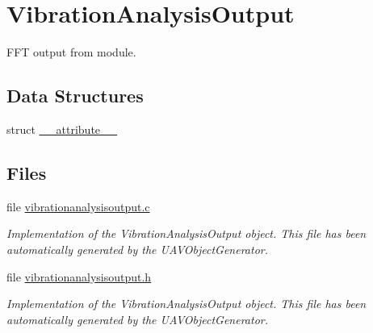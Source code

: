 \hypertarget{group___vibration_analysis_output}{\section{\-Vibration\-Analysis\-Output}
\label{group___vibration_analysis_output}
}


\-F\-F\-T output from  module.  


\subsection*{\-Data \-Structures}
\begin{DoxyCompactItemize}
\item 
struct \hyperlink{struct____attribute____}{\-\_\-\-\_\-attribute\-\_\-\-\_\-}
\end{DoxyCompactItemize}
\subsection*{\-Files}
\begin{DoxyCompactItemize}
\item 
file \hyperlink{vibrationanalysisoutput_8c}{vibrationanalysisoutput.\-c}
\begin{DoxyCompactList}\small\item\em \-Implementation of the \-Vibration\-Analysis\-Output object. \-This file has been automatically generated by the \-U\-A\-V\-Object\-Generator. \end{DoxyCompactList}\item 
file \hyperlink{vibrationanalysisoutput_8h}{vibrationanalysisoutput.\-h}
\begin{DoxyCompactList}\small\item\em \-Implementation of the \-Vibration\-Analysis\-Output object. \-This file has been automatically generated by the \-U\-A\-V\-Object\-Generator. \end{DoxyCompactList}\end{DoxyCompactItemize}
